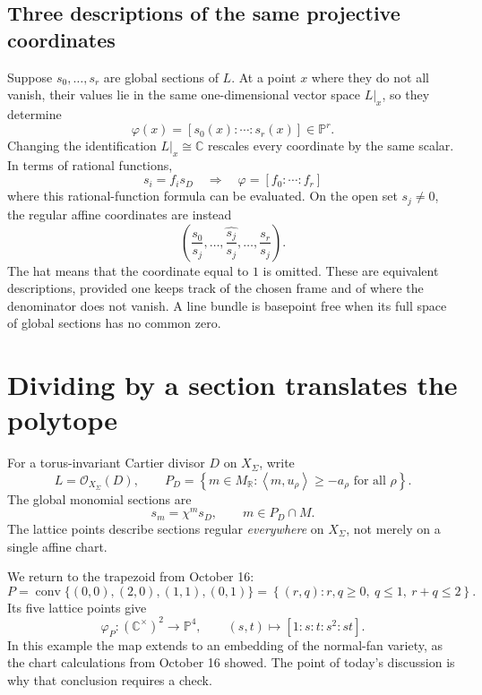\documentclass[11pt]{article}
\theoremstyle{definition}
\theoremstyle{remark}
\DeclareMathOperator{\Conv}{conv}
\newcommand{\Sg}{\Sigma}
\newcommand{\cO}{\mathcal{O}}
\newcommand{\set}[1]{\left\{#1\right\}}
\newcommand{\braket}[2]{\left\langle #1,#2\right\rangle}
\newcommand{\bP}{\mathbb{P}}
\newcommand{\bR}{\mathbb{R}}
\newcommand{\bC}{\mathbb{C}}
\newcommand{\vf}{\varphi}
\newcommand{\isom}{\cong}
\begin{document}
\subsection{Three descriptions of the same projective coordinates}

Suppose \(s_0,\ldots,s_r\) are global sections of \(L\). At a point \(x\)
where they do not all vanish, their values lie in the same
one-dimensional vector space \(L|_x\), so they determine
\[
    \vf(x)=[s_0(x):\cdots:s_r(x)]\in\bP^r.
\]
Changing the identification \(L|_x\isom\bC\) rescales every coordinate
by the same scalar. In terms of rational functions,
\[
    s_i=f_i s_D
    \quad\Longrightarrow\quad
    \vf=[f_0:\cdots:f_r]
\]
where this rational-function formula can be evaluated. On the open set
\(s_j\ne0\), the regular affine coordinates are instead
\[
    \left(\frac{s_0}{s_j},\ldots,\widehat{\frac{s_j}{s_j}},
          \ldots,\frac{s_r}{s_j}\right).
\]
The hat means that the coordinate equal to \(1\) is omitted.
These are equivalent descriptions, provided one keeps track of the
chosen frame and of where the denominator does not vanish. A line
bundle is basepoint free when its full space of global sections has
no common zero.

\section{Dividing by a section translates the polytope}

For a torus-invariant Cartier divisor \(D\) on \(X_\Sg\), write
\[
    L=\cO_{X_\Sg}(D),\qquad
    P_D=\set{m\in M_\bR:
       \braket{m}{u_\rho}\geq-a_\rho\text{ for all }\rho}.
\]
The global monomial sections are
\[
    s_m=\chi^m s_D,\qquad m\in P_D\cap M.
\]
The lattice points describe sections regular \emph{everywhere} on
\(X_\Sg\), not merely on a single affine chart.

We return to the trapezoid from October 16:
\[
    P=\Conv\{(0,0),(2,0),(1,1),(0,1)\}
      =\set{(r,q):r,q\geq0,\ q\leq1,\ r+q\leq2}.
\]
Its five lattice points give
\[
    \vf_P:(\bC^\times)^2\longrightarrow\bP^4,\qquad
    (s,t)\longmapsto[1:s:t:s^2:st].
\]
In this example the map extends to an embedding of the normal-fan
variety, as the chart calculations from October 16 showed.
The point of today's discussion is why that conclusion requires a check.
\end{document}
